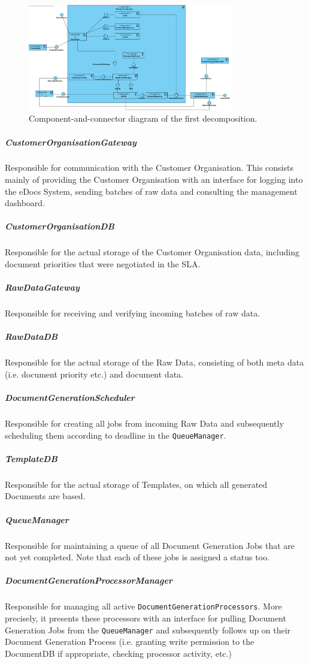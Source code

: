 \documentclass[a4paper,10pt]{article}
\begin{document}
\begin{figure}[!htp]
	\centering
	\includegraphics[width=0.8\textwidth]{DeliveryFunctionality.png}
	\caption{Component-and-connector diagram of the first decomposition.
	}\label{fig:compandcondecomp1}
\end{figure}
\subparagraph{CustomerOrganisationGateway}
Responsible for communication with the Customer Organisation. This consists mainly of providing the Customer Organisation with an interface for logging into the eDocs System, sending batches of raw data and consulting the management dashboard.

\subparagraph{CustomerOrganisationDB}
Responsible for the actual storage of the Customer Organisation data, including document priorities that were negotiated in the SLA.

\subparagraph{RawDataGateway}
Responsible for receiving and verifying incoming batches of raw data.

\subparagraph{RawDataDB}
Responsible for the actual storage of the Raw Data, consisting of both meta data (i.e. document priority etc.) and document data.

\subparagraph{DocumentGenerationScheduler}
Responsible for creating all jobs from incoming Raw Data and subsequently scheduling them according to deadline in the \texttt{QueueManager}.
 
\subparagraph{TemplateDB}
Responsible for the actual storage of Templates, on which all generated Documents are based.

\subparagraph{QueueManager}
Responsible for maintaining a queue of all Document Generation Jobs that are not yet completed. Note that each of these jobs is assigned a status too.

\subparagraph{DocumentGenerationProcessorManager}
Responsible for managing all active \texttt{DocumentGenerationProcessors}. More precisely, it presents these processors with an interface for pulling Document Generation Jobs from the \texttt{QueueManager} and subsequently follows up on their Document Generation Process (i.e. granting write permission to the DocumentDB if appropriate, checking processor activity, etc.)
\end{document}
